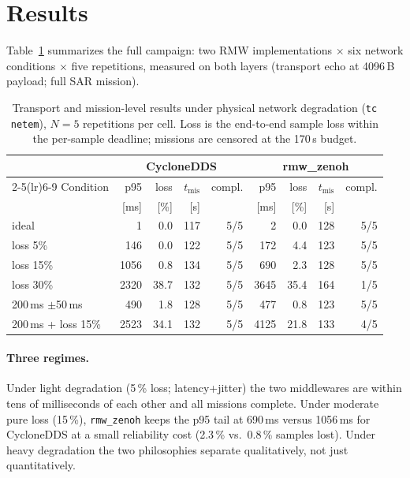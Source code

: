 
\section{Results}
\label{sec:results}

Table~\ref{tab:campaign} summarizes the full campaign: two RMW
implementations $\times$ six network conditions $\times$ five repetitions,
measured on both layers (transport echo at 4096\,B payload; full SAR mission).

\begin{table}[t]
\centering
\caption{Transport and mission-level results under physical network
degradation (\texttt{tc netem}), $N{=}5$ repetitions per cell. Loss is the
end-to-end sample loss within the per-sample deadline; missions are censored
at the 170\,s budget.}
\label{tab:campaign}
\setlength{\tabcolsep}{3.6pt}
\begin{tabular}{l rrrr rrrr}
\toprule
& \multicolumn{4}{c}{CycloneDDS} & \multicolumn{4}{c}{rmw\_zenoh} \\
\cmidrule(lr){2-5}\cmidrule(lr){6-9}
Condition & p95 & loss & $t_{\mathrm{mis}}$ & compl.
          & p95 & loss & $t_{\mathrm{mis}}$ & compl. \\
          & [ms] & [\%] & [s] & & [ms] & [\%] & [s] & \\
\midrule
ideal & 1 & 0.0 & 117 & 5/5 & 2 & 0.0 & 128 & 5/5 \\
loss 5\% & 146 & 0.0 & 122 & 5/5 & 172 & 4.4 & 123 & 5/5 \\
loss 15\% & 1056 & 0.8 & 134 & 5/5 & 690 & 2.3 & 128 & 5/5 \\
loss 30\% & 2320 & 38.7 & 132 & 5/5 & 3645 & 35.4 & 164 & 1/5 \\
200\,ms $\pm$50\,ms & 490 & 1.8 & 128 & 5/5 & 477 & 0.8 & 123 & 5/5 \\
200\,ms + loss 15\% & 2523 & 34.1 & 132 & 5/5 & 4125 & 21.8 & 133 & 4/5 \\
\bottomrule
\end{tabular}
\end{table}

\paragraph{Three regimes.}
Under light degradation (5\,\% loss; latency+jitter) the two middlewares are
within tens of milliseconds of each other and all missions complete. Under
moderate pure loss (15\,\%), \texttt{rmw\_zenoh} keeps the p95 tail at
690\,ms versus 1056\,ms for CycloneDDS at a small reliability cost
(2.3\,\% vs.\ 0.8\,\% samples lost). Under heavy degradation the two
philosophies separate qualitatively, not just quantitatively.

